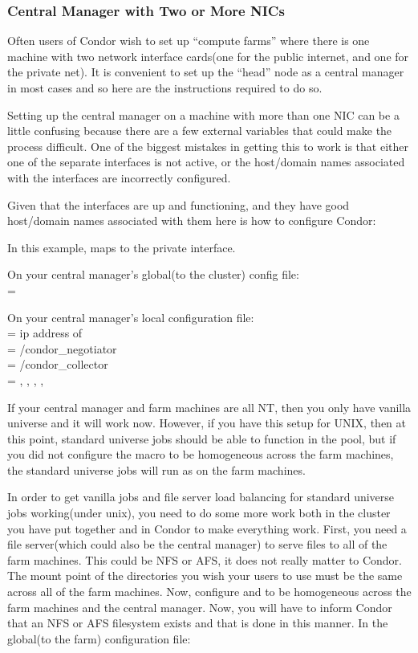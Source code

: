 \subsubsection{Central Manager with Two or More NICs}

Often users of Condor wish to set up ``compute farms'' where there is one
machine with two network interface cards(one for the public internet,
and one for the private net). It is convenient to set up the ``head''
node as a central manager in most cases and so here are the instructions
required to do so.

Setting up the central manager on a machine with more than one NIC can
be a little confusing because there are a few external variables
that could make the process difficult. One of the biggest mistakes
in getting this to work is that either one of the separate interfaces is
not active, or the host/domain names associated with the interfaces are
incorrectly configured. 

Given that the interfaces are up and functioning, and they have good
host/domain names associated with them here is how to configure Condor:

In this example,  maps to the private interface.

On your central manager's global(to the cluster) config file: \\
 = 

On your central manager's local configuration file: \\
 = ip address of  \\
 = /condor\_negotiator \\
 = /condor\_collector \\
 = , , , , 

If your central manager and farm machines are all NT, then you only have
vanilla universe and it will work now.  However, if you have this setup
for UNIX, then at this point, standard universe jobs should be able to
function in the pool, but if you did not configure the 
macro to be homogeneous across the farm machines, the standard universe
jobs will run as  on the farm machines.

In order to get vanilla jobs and file server load balancing for standard
universe jobs working(under unix), you need to do some more work both in
the cluster you have put together and in Condor to make everything work.
First, you need a file server(which could also be the central manager) to
serve files to all of the farm machines. This could be NFS or AFS, it does
not really matter to Condor. The mount point of the directories you wish
your users to use must be the same across all of the farm machines. Now,
configure  and  to be
homogeneous across the farm machines and the central manager. Now, you
will have to inform Condor that an NFS or AFS filesystem exists and that
is done in this manner. In the global(to the farm) configuration file:

